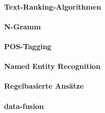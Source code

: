 \paragraph{Text-Ranking-Algorithmen}

\paragraph{N-Gramm}

\paragraph{POS-Tagging}

\paragraph{Named Entity Recognition}

\paragraph{Regelbasierte Ansätze}

\paragraph{data-fusion}